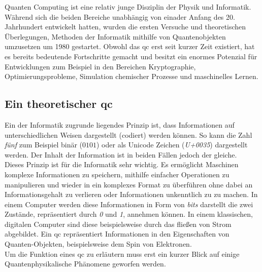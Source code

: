 Quanten Computing ist eine relativ junge Disziplin der Physik und Informatik. Während sich die beiden Bereiche unabhängig von einader Anfang des 20. Jahrhundert entwickelt hatten, wurden die ersten Versuche und theoretischen Überlegungen, Methoden der Informatik mithilfe von Quantenobjekten umzusetzen um 1980 gestartet. Obwohl das \ac{qc} erst seit kurzer Zeit existiert, hat es bereits bedeutende Fortschritte gemacht und besitzt ein enormes Potenzial für Entwicklungen zum Beispiel in den Bereichen Kryptographie, Optimierungsprobleme, Simulation chemischer Prozesse und maschinelles Lernen.

\subsection{Ein theoretischer \ac{qc}}
Ein der Informatik zugrunde liegendes Prinzip ist, dass \cite[S122]{steane_quantum_1998} Informationen auf unterschiedlichen Weisen dargestellt (codiert) werden können. So kann die Zahl \textit{fünf} zum Beispiel binär ($0101$) oder als Unicode Zeichen (\textit{U+0035}) dargestellt werden. Der Inhalt der Information ist in beiden Fällen jedoch der gleiche.\\
Dieses Prinzip ist für die Informatik sehr wichtig. Es ermöglicht Maschinen komplexe Informationen zu speichern, mithilfe einfacher Operationen zu manipulieren und wieder in ein komplexes Format zu überführen ohne dabei an Informationsgehalt zu verlieren oder Informationen unkenntlich zu zu machen. In einem Computer werden diese Informationen in Form von \textit{bits} darstellt die zwei Zustände, repräsentiert durch \textit{0} und \textit{1}, annehmen können. In einem klassischen, digitalen Computer sind diese beispielsweise durch das fließen von Strom abgebildet. Ein \ac{qc} repräsentiert Informationen in den Eigenschaften von Quanten-Objekten, beispielsweise dem Spin von Elektronen.\\
Um die Funktion eines \ac{qc} zu erläutern muss erst ein kurzer Blick auf einige Quantenphysikalische Phänomene geworfen werden.

